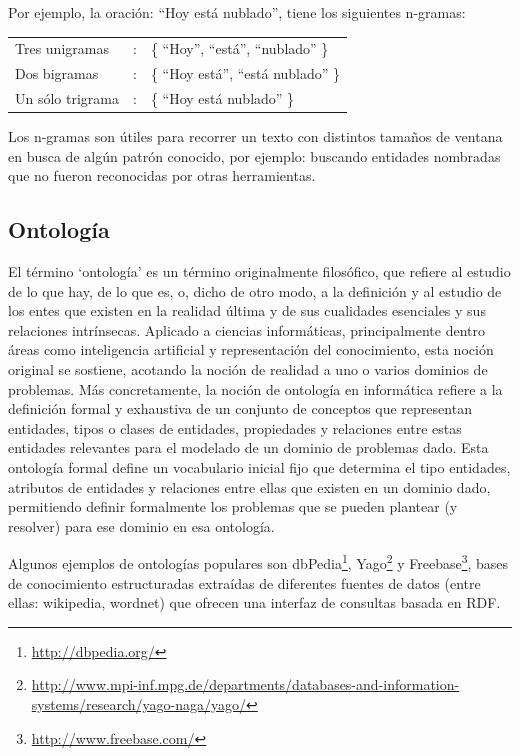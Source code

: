 Por ejemplo, la oración: {\textquotedblleft}Hoy está nublado{\textquotedblright}, tiene los siguientes n-gramas:

\begin{tabular}{lll}
Tres unigramas & : & \{ {\textquotedblleft}Hoy{\textquotedblright}, {\textquotedblleft}está{\textquotedblright}, {\textquotedblleft}nublado{\textquotedblright} \} \\
Dos bigramas & : & \{ {\textquotedblleft}Hoy está{\textquotedblright}, {\textquotedblleft}está nublado{\textquotedblright} \} \\
Un sólo trigrama & : & \{ {\textquotedblleft}Hoy está nublado{\textquotedblright} \}\\
\end{tabular}
\medskip

Los n-gramas son útiles para recorrer un texto con distintos tamaños de ventana en busca de algún patrón conocido, por ejemplo: buscando entidades nombradas que no fueron reconocidas por otras herramientas.

\subsection*{Ontología}
El término `ontología' es un término originalmente filosófico, que refiere al estudio de lo que hay, de lo que es, o, dicho de otro modo, a la definición y al estudio de los entes que existen en la realidad última y de sus cualidades esenciales y sus relaciones intrínsecas. Aplicado a ciencias informáticas, principalmente dentro áreas como inteligencia artificial y representación del conocimiento, esta noción original se sostiene, acotando la noción de realidad a uno o varios dominios de problemas. Más concretamente, la noción de ontología en informática refiere a la definición formal y exhaustiva de un conjunto de conceptos que representan entidades, tipos o clases de entidades, propiedades y relaciones entre estas entidades relevantes para el modelado de un dominio de problemas dado. Esta ontología formal define un vocabulario inicial fijo que determina el tipo entidades, atributos de entidades y relaciones entre ellas que existen en un dominio dado, permitiendo definir formalmente los problemas que se pueden plantear (y resolver) para ese dominio en esa ontología.

Algunos ejemplos de ontologías populares son dbPedia\footnote{\url{http://dbpedia.org/}}, Yago\footnote{\url{http://www.mpi-inf.mpg.de/departments/databases-and-information-systems/research/yago-naga/yago/}} y Freebase\footnote{\url{http://www.freebase.com/}}, bases de conocimiento estructuradas extraídas de diferentes fuentes de datos (entre ellas: wikipedia, wordnet) que ofrecen una interfaz de consultas basada en RDF.


